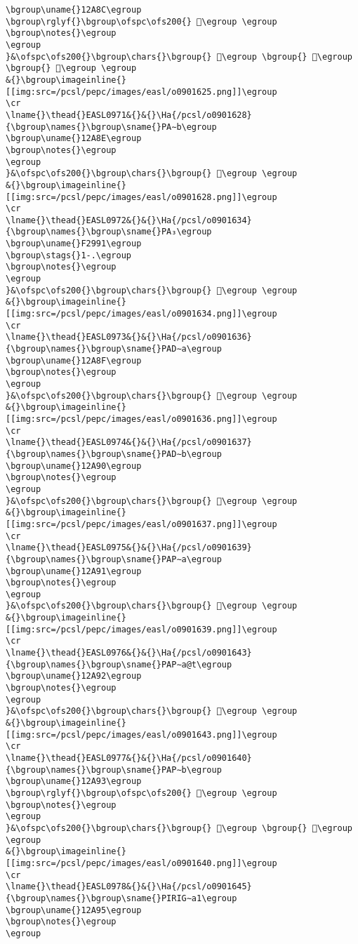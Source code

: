\begin{verbatim}
\bgroup\uname{}12A8C\egroup
\bgroup\rglyf{}\bgroup\ofspc\ofs200{} 𒪌\egroup \egroup
\bgroup\notes{}\egroup
\egroup
}&\ofspc\ofs200{}\bgroup\chars{}\bgroup{} 𒪋\egroup \bgroup{} 𒪌\egroup \bgroup{} 𒪍\egroup \egroup
&{}\bgroup\imageinline{}[[img:src=/pcsl/pepc/images/easl/o0901625.png]]\egroup
\cr
\lname{}\thead{}EASL0971&{}&{}\Ha{/pcsl/o0901628}{\bgroup\names{}\bgroup\sname{}PA∼b\egroup
\bgroup\uname{}12A8E\egroup
\bgroup\notes{}\egroup
\egroup
}&\ofspc\ofs200{}\bgroup\chars{}\bgroup{} 𒪎\egroup \egroup
&{}\bgroup\imageinline{}[[img:src=/pcsl/pepc/images/easl/o0901628.png]]\egroup
\cr
\lname{}\thead{}EASL0972&{}&{}\Ha{/pcsl/o0901634}{\bgroup\names{}\bgroup\sname{}PA₃\egroup
\bgroup\uname{}F2991\egroup
\bgroup\stags{}1-.\egroup
\bgroup\notes{}\egroup
\egroup
}&\ofspc\ofs200{}\bgroup\chars{}\bgroup{} 󲦑\egroup \egroup
&{}\bgroup\imageinline{}[[img:src=/pcsl/pepc/images/easl/o0901634.png]]\egroup
\cr
\lname{}\thead{}EASL0973&{}&{}\Ha{/pcsl/o0901636}{\bgroup\names{}\bgroup\sname{}PAD∼a\egroup
\bgroup\uname{}12A8F\egroup
\bgroup\notes{}\egroup
\egroup
}&\ofspc\ofs200{}\bgroup\chars{}\bgroup{} 𒪏\egroup \egroup
&{}\bgroup\imageinline{}[[img:src=/pcsl/pepc/images/easl/o0901636.png]]\egroup
\cr
\lname{}\thead{}EASL0974&{}&{}\Ha{/pcsl/o0901637}{\bgroup\names{}\bgroup\sname{}PAD∼b\egroup
\bgroup\uname{}12A90\egroup
\bgroup\notes{}\egroup
\egroup
}&\ofspc\ofs200{}\bgroup\chars{}\bgroup{} 𒪐\egroup \egroup
&{}\bgroup\imageinline{}[[img:src=/pcsl/pepc/images/easl/o0901637.png]]\egroup
\cr
\lname{}\thead{}EASL0975&{}&{}\Ha{/pcsl/o0901639}{\bgroup\names{}\bgroup\sname{}PAP∼a\egroup
\bgroup\uname{}12A91\egroup
\bgroup\notes{}\egroup
\egroup
}&\ofspc\ofs200{}\bgroup\chars{}\bgroup{} 𒪑\egroup \egroup
&{}\bgroup\imageinline{}[[img:src=/pcsl/pepc/images/easl/o0901639.png]]\egroup
\cr
\lname{}\thead{}EASL0976&{}&{}\Ha{/pcsl/o0901643}{\bgroup\names{}\bgroup\sname{}PAP∼a@t\egroup
\bgroup\uname{}12A92\egroup
\bgroup\notes{}\egroup
\egroup
}&\ofspc\ofs200{}\bgroup\chars{}\bgroup{} 𒪒\egroup \egroup
&{}\bgroup\imageinline{}[[img:src=/pcsl/pepc/images/easl/o0901643.png]]\egroup
\cr
\lname{}\thead{}EASL0977&{}&{}\Ha{/pcsl/o0901640}{\bgroup\names{}\bgroup\sname{}PAP∼b\egroup
\bgroup\uname{}12A93\egroup
\bgroup\rglyf{}\bgroup\ofspc\ofs200{} 𒪓\egroup \egroup
\bgroup\notes{}\egroup
\egroup
}&\ofspc\ofs200{}\bgroup\chars{}\bgroup{} 𒪓\egroup \bgroup{} 𒪔\egroup \egroup
&{}\bgroup\imageinline{}[[img:src=/pcsl/pepc/images/easl/o0901640.png]]\egroup
\cr
\lname{}\thead{}EASL0978&{}&{}\Ha{/pcsl/o0901645}{\bgroup\names{}\bgroup\sname{}PIRIG∼a1\egroup
\bgroup\uname{}12A95\egroup
\bgroup\notes{}\egroup
\egroup

\end{verbatim}
